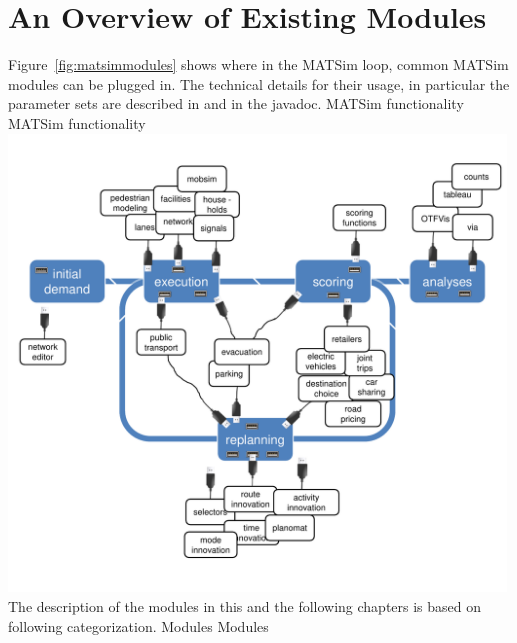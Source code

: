 \section{An Overview of Existing Modules}
Figure~\ref{fig:matsimmodules} shows where in the MATSim loop, common MATSim modules can be plugged in. The technical details for their usage, in particular the parameter sets are described in \citep[][]{MATSim_Userguide_2014} and in the javadoc.
%
\createfigure%
{MATSim functionality}%
{MATSim functionality}%
{\label{fig:matsimmodules}}%
{\includegraphics[width=0.99\textwidth, angle=0]{extending/figures/modules.pdf}}%
{}
%
The description of the modules in this and the following chapters is based on following categorization.
%
\createtable%
{Modules}%
{Modules}%
{\label{tab:modules}}%
